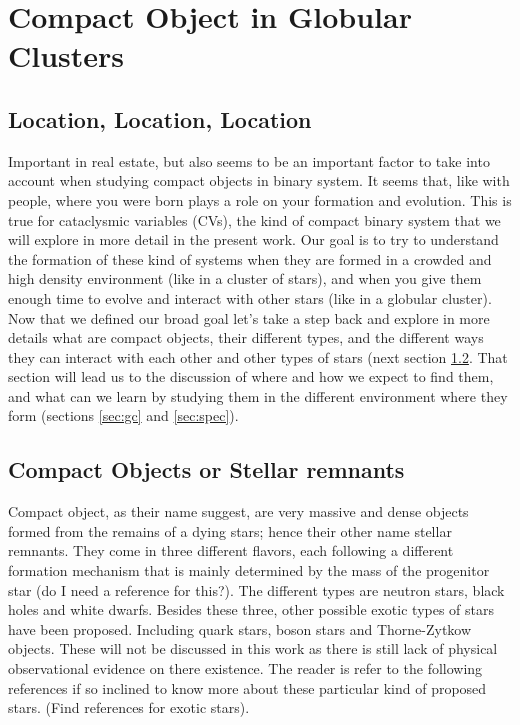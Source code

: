 
\chapter{Compact Object in Globular Clusters}
\thispagestyle{fancy}

\section{Location, Location, Location}

Important in real estate, but also seems to be an important factor to take into account when studying compact objects in binary system. It seems that, like with people, where you were born plays a role on your formation and evolution. This is true for cataclysmic variables (CVs), the kind of compact binary system that we will explore in more detail in the present work. Our goal is to try to understand the formation of these kind of systems when they are formed in a crowded and high density environment (like in a cluster of stars), and when you give them enough time to evolve and interact with other stars (like in a globular cluster). \\ 

Now that we defined our broad goal let's take a step back and explore in more details what are compact objects, their different types, and the different ways they can interact with each other and other types of stars (next section \ref{sec:co}. That section will lead us to the discussion of where and how we expect to find them, and what can we learn by studying them in the different environment where they form (sections \ref{sec:gc} and \ref{sec:spec}).

\section{Compact Objects or Stellar remnants}\label{sec:co}

Compact object, as their name suggest, are very massive and dense objects formed from the remains of a dying stars; hence their other name stellar remnants. They come in three different flavors, each following a different formation mechanism that is mainly determined by the mass of the progenitor star (do I need a reference for this?). The different types are neutron stars, black holes and white dwarfs. Besides these three, other possible exotic types of stars have been proposed. Including quark stars, boson stars and Thorne-Zytkow objects. These will not be discussed in this work as there is still lack of physical observational evidence on there existence. The reader is refer to the following references if so inclined to know more about these particular kind of proposed stars. (Find references for exotic stars).


